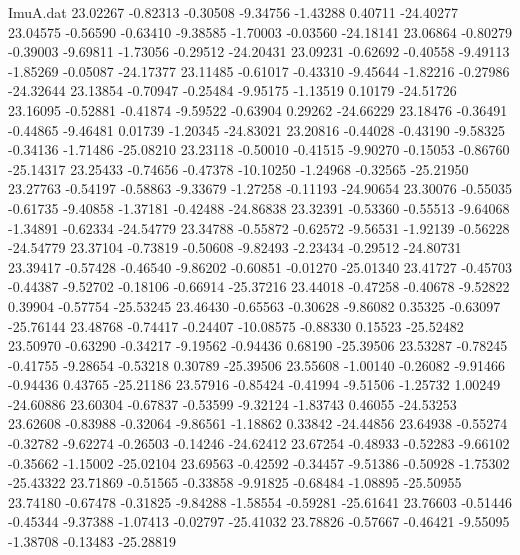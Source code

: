 \begin{filecontents}{ImuA.dat}
  23.02267   -0.82313   -0.30508   -9.34756   -1.43288    0.40711  -24.40277
  23.04575   -0.56590   -0.63410   -9.38585   -1.70003   -0.03560  -24.18141
  23.06864   -0.80279   -0.39003   -9.69811   -1.73056   -0.29512  -24.20431
  23.09231   -0.62692   -0.40558   -9.49113   -1.85269   -0.05087  -24.17377
  23.11485   -0.61017   -0.43310   -9.45644   -1.82216   -0.27986  -24.32644
  23.13854   -0.70947   -0.25484   -9.95175   -1.13519    0.10179  -24.51726
  23.16095   -0.52881   -0.41874   -9.59522   -0.63904    0.29262  -24.66229
  23.18476   -0.36491   -0.44865   -9.46481    0.01739   -1.20345  -24.83021
  23.20816   -0.44028   -0.43190   -9.58325   -0.34136   -1.71486  -25.08210
  23.23118   -0.50010   -0.41515   -9.90270   -0.15053   -0.86760  -25.14317
  23.25433   -0.74656   -0.47378  -10.10250   -1.24968   -0.32565  -25.21950
  23.27763   -0.54197   -0.58863   -9.33679   -1.27258   -0.11193  -24.90654
  23.30076   -0.55035   -0.61735   -9.40858   -1.37181   -0.42488  -24.86838
  23.32391   -0.53360   -0.55513   -9.64068   -1.34891   -0.62334  -24.54779
  23.34788   -0.55872   -0.62572   -9.56531   -1.92139   -0.56228  -24.54779
  23.37104   -0.73819   -0.50608   -9.82493   -2.23434   -0.29512  -24.80731
  23.39417   -0.57428   -0.46540   -9.86202   -0.60851   -0.01270  -25.01340
  23.41727   -0.45703   -0.44387   -9.52702   -0.18106   -0.66914  -25.37216
  23.44018   -0.47258   -0.40678   -9.52822    0.39904   -0.57754  -25.53245
  23.46430   -0.65563   -0.30628   -9.86082    0.35325   -0.63097  -25.76144
  23.48768   -0.74417   -0.24407  -10.08575   -0.88330    0.15523  -25.52482
  23.50970   -0.63290   -0.34217   -9.19562   -0.94436    0.68190  -25.39506
  23.53287   -0.78245   -0.41755   -9.28654   -0.53218    0.30789  -25.39506
  23.55608   -1.00140   -0.26082   -9.91466   -0.94436    0.43765  -25.21186
  23.57916   -0.85424   -0.41994   -9.51506   -1.25732    1.00249  -24.60886
  23.60304   -0.67837   -0.53599   -9.32124   -1.83743    0.46055  -24.53253
  23.62608   -0.83988   -0.32064   -9.86561   -1.18862    0.33842  -24.44856
  23.64938   -0.55274   -0.32782   -9.62274   -0.26503   -0.14246  -24.62412
  23.67254   -0.48933   -0.52283   -9.66102   -0.35662   -1.15002  -25.02104
  23.69563   -0.42592   -0.34457   -9.51386   -0.50928   -1.75302  -25.43322
  23.71869   -0.51565   -0.33858   -9.91825   -0.68484   -1.08895  -25.50955
  23.74180   -0.67478   -0.31825   -9.84288   -1.58554   -0.59281  -25.61641
  23.76603   -0.51446   -0.45344   -9.37388   -1.07413   -0.02797  -25.41032
  23.78826   -0.57667   -0.46421   -9.55095   -1.38708   -0.13483  -25.28819

\end{filecontents}
